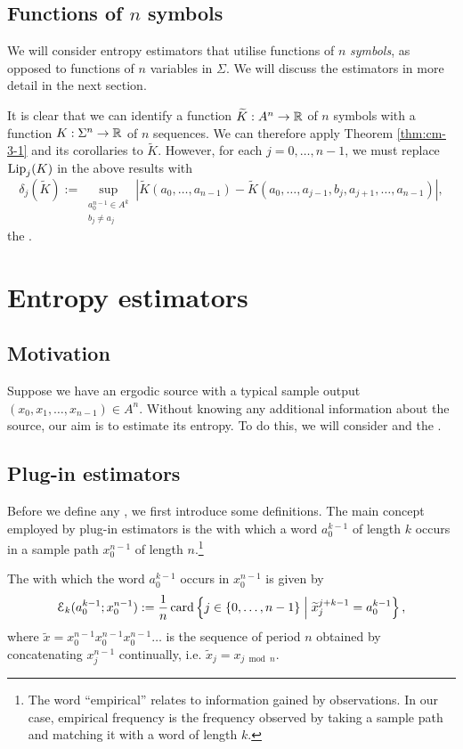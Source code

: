\subsection{Functions of \texorpdfstring{$n$}{n} symbols}
We will consider entropy estimators that utilise functions of $n$ \emph{symbols}, as opposed to functions of $n$ variables in $\Sigma$. We will discuss the estimators in more detail in the next section.

It is clear that we can identify a function $\widetilde{K} : A^n \to \mathbb{R}$ of $n$ symbols with a function $K : \Sigma^n \to \mathbb{R}$ of $n$ sequences. We can therefore apply Theorem \ref{thm:cm-3-1} and its corollaries to $\tilde{K}$. However, for each $j = 0, \dots, n - 1$, we must replace $\operatorname{Lip}_j(K)$ in the above results with
\[
	\delta_j(\tilde{K}) := \sup_{\substack{a_0^{n - 1} \in A^k \\ b_j \neq a_j}}{|\tilde{K}(a_0, \dots, a_{n - 1}) - \tilde{K}(a_0, \dots, a_{j - 1}, b_j, a_{j + 1}, \dots, a_{n - 1})|},
\]
the .

\section{Entropy estimators}\label{sec:estimator-bounds}
\subsection{Motivation}
Suppose we have an ergodic source with a typical sample output $(x_0, x_1, \dots, x_{n - 1}) \in A^n$. Without knowing any additional information about the source, our aim is to estimate its entropy. To do this, we will consider  and the .

\subsection{Plug-in estimators}
Before we define any , we first introduce some definitions. The main concept employed by plug-in estimators is the  with which a word $a_0^{k - 1}$ of length $k$ occurs in a sample path $x_0^{n - 1}$ of length $n$.\footnote{The word ``empirical'' relates to information gained by observations. In our case, empirical frequency is the frequency observed by taking a sample path and matching it with a word of length $k$.}

\begin{definition}
	The  with which the word $a_0^{k - 1}$ occurs in $x_0^{n - 1}$ is given by
	\[
		\mathcal{E}_k(a_0^{k - 1}; x_0^{n - 1}) := \frac{1}{n}\operatorname{card}\left\{j \in \{0, \dots, n - 1\} \mathrel{}\middle|\mathrel{} \widetilde{x}_j^{j + k - 1} = a_0^{k - 1} \right\},
	\]
	where $\tilde{x} = x_0^{n - 1} x_0^{n - 1} x_0^{n - 1} \dots$ is the sequence of period $n$ obtained by concatenating $x_j^{n - 1}$ continually, i.e. $\tilde{x}_j = x_{j \bmod n}$.
\end{definition}

